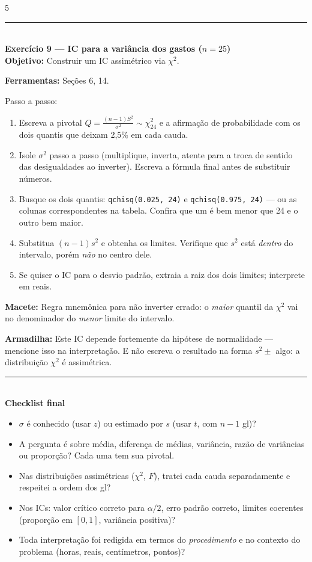 \documentclass[a4paper,8pt]{extarticle}
\newcommand{\tit}[1]{\vspace{2pt}\textcolor{azul}{\rule{\linewidth}{0.6pt}}\\[1pt]\textbf{\textcolor{azul}{#1}}\\[1pt]}
\newcommand{\mac}[1]{\textcolor{verde}{\textbf{Macete:}} #1\par}
\newcommand{\arm}[1]{\textcolor{vinho}{\textbf{Armadilha:}} #1\par}
\newcommand{\ferr}[1]{\textbf{Ferramentas:} #1\par}
\newcommand{\obj}[1]{\textbf{Objetivo:} #1\par}
\newcommand{\R}[1]{\texttt{\footnotesize #1}}
\begin{document}
\begin{multicols*}{5}
\tit{Exercício 9 — IC para a variância dos gastos ($n=25$)}
\obj{Construir um IC assimétrico via $\chi^2$.}
\ferr{Seções 6, 14.}
Passo a passo:
\begin{enumerate}
\item Escreva a pivotal $Q=\frac{(n-1)S^2}{\sigma^2}\sim\chi^2_{24}$ e a afirmação de probabilidade com os dois quantis que deixam 2,5\% em cada cauda.
\item Isole $\sigma^2$ passo a passo (multiplique, inverta, atente para a troca de sentido das desigualdades ao inverter). Escreva a fórmula final antes de substituir números.
\item Busque os dois quantis: \R{qchisq(0.025, 24)} e \R{qchisq(0.975, 24)} — ou as colunas correspondentes na tabela. Confira que um é bem menor que 24 e o outro bem maior.
\item Substitua $(n-1)s^2$ e obtenha os limites. Verifique que $s^2$ está \emph{dentro} do intervalo, porém \emph{não} no centro dele.
\item Se quiser o IC para o desvio padrão, extraia a raiz dos dois limites; interprete em reais.
\end{enumerate}
\mac{Regra mnemônica para não inverter errado: o \emph{maior} quantil da $\chi^2$ vai no denominador do \emph{menor} limite do intervalo.}
\arm{Este IC depende fortemente da hipótese de normalidade — mencione isso na interpretação. E não escreva o resultado na forma $s^2\pm$ algo: a distribuição $\chi^2$ é assimétrica.}

\tit{Checklist final}
\begin{itemize}
\item $\sigma$ é conhecido (usar $z$) ou estimado por $s$ (usar $t$, com $n-1$ gl)?
\item A pergunta é sobre média, diferença de médias, variância, razão de variâncias ou proporção? Cada uma tem sua pivotal.
\item Nas distribuições assimétricas ($\chi^2$, $F$), tratei cada cauda separadamente e respeitei a ordem dos gl?
\item Nos ICs: valor crítico correto para $\alpha/2$, erro padrão correto, limites coerentes (proporção em $[0,1]$, variância positiva)?
\item Toda interpretação foi redigida em termos do \emph{procedimento} e no contexto do problema (horas, reais, centímetros, pontos)?
\end{itemize}

\end{multicols*}
\end{document}
